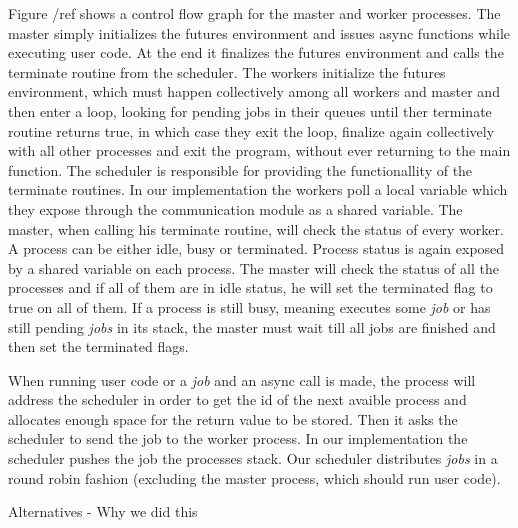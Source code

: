 Figure /ref shows a control flow graph for the master and worker processes.  The master simply initializes
the futures environment and issues async functions while executing user code.  At the end it finalizes 
the futures environment and calls the terminate routine from the scheduler.  The workers initialize 
the futures environment, which must happen collectively among all workers and master and then enter a
loop, looking for pending jobs in their queues until ther terminate routine returns true, in which case
they exit the loop, finalize again collectively with all other processes and exit the program, without ever
returning to the main function.  The scheduler is responsible for providing the functionallity of the terminate
routines.  In our implementation the workers poll a local variable which they expose through the communication
module as a shared variable.  The master, when calling his terminate routine, will check the status of every 
worker.  A process can be either idle, busy or terminated.  Process status is again exposed by a shared variable
on each process.  The master will check the status of all the processes and if all of them are in idle status, he
will set the terminated flag to true on all of them.  If a process is still busy, meaning executes some \emph{job}
or has still pending \emph{jobs} in its stack, the master must wait till all jobs are finished and then set the 
terminated flags.

When running user code or a \emph{job} and an async call is made, the process will address the scheduler in order
to get the id of the next avaible process and allocates enough space for the return value to be stored.
Then it asks the scheduler to send the job to the worker process.  In our implementation the scheduler 
pushes the job the processes stack.  Our scheduler distributes \emph{jobs} in a round robin fashion 
(excluding the master process, which should run user code).       
         
Alternatives - Why we did this

